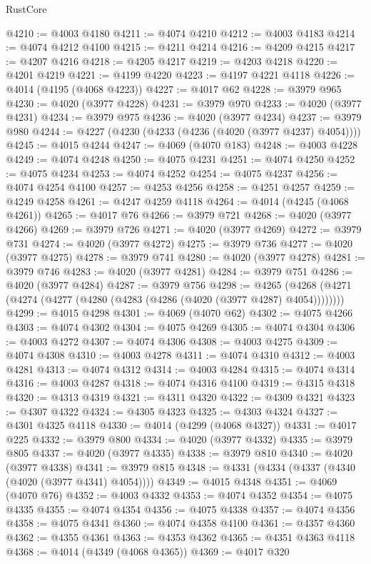 \begin{lexlean}{RustCore}
\begin{coremodule}
@4210 := @4003 @4180
@4211 := @4074 @4210
@4212 := @4003 @4183
@4214 := @4074 @4212 @4100
@4215 := @4211 @4214
@4216 := @4209 @4215
@4217 := @4207 @4216
@4218 := @4205 @4217
@4219 := @4203 @4218
@4220 := @4201 @4219
@4221 := @4199 @4220
@4223 := @4197 @4221 @4118
@4226 := @4014 (@4195 (@4068 @4223))
@4227 := @4017 @62
@4228 := @3979 @965
@4230 := @4020 (@3977 @4228)
@4231 := @3979 @970
@4233 := @4020 (@3977 @4231)
@4234 := @3979 @975
@4236 := @4020 (@3977 @4234)
@4237 := @3979 @980
@4244 := @4227 (@4230 (@4233 (@4236 (@4020 (@3977 @4237) @4054))))
@4245 := @4015 @4244
@4247 := @4069 (@4070 @183)
@4248 := @4003 @4228
@4249 := @4074 @4248
@4250 := @4075 @4231
@4251 := @4074 @4250
@4252 := @4075 @4234
@4253 := @4074 @4252
@4254 := @4075 @4237
@4256 := @4074 @4254 @4100
@4257 := @4253 @4256
@4258 := @4251 @4257
@4259 := @4249 @4258
@4261 := @4247 @4259 @4118
@4264 := @4014 (@4245 (@4068 @4261))
@4265 := @4017 @76
@4266 := @3979 @721
@4268 := @4020 (@3977 @4266)
@4269 := @3979 @726
@4271 := @4020 (@3977 @4269)
@4272 := @3979 @731
@4274 := @4020 (@3977 @4272)
@4275 := @3979 @736
@4277 := @4020 (@3977 @4275)
@4278 := @3979 @741
@4280 := @4020 (@3977 @4278)
@4281 := @3979 @746
@4283 := @4020 (@3977 @4281)
@4284 := @3979 @751
@4286 := @4020 (@3977 @4284)
@4287 := @3979 @756
@4298 := @4265 (@4268 (@4271 (@4274 (@4277 (@4280 (@4283 (@4286 (@4020 (@3977 @4287) @4054))))))))
@4299 := @4015 @4298
@4301 := @4069 (@4070 @62)
@4302 := @4075 @4266
@4303 := @4074 @4302
@4304 := @4075 @4269
@4305 := @4074 @4304
@4306 := @4003 @4272
@4307 := @4074 @4306
@4308 := @4003 @4275
@4309 := @4074 @4308
@4310 := @4003 @4278
@4311 := @4074 @4310
@4312 := @4003 @4281
@4313 := @4074 @4312
@4314 := @4003 @4284
@4315 := @4074 @4314
@4316 := @4003 @4287
@4318 := @4074 @4316 @4100
@4319 := @4315 @4318
@4320 := @4313 @4319
@4321 := @4311 @4320
@4322 := @4309 @4321
@4323 := @4307 @4322
@4324 := @4305 @4323
@4325 := @4303 @4324
@4327 := @4301 @4325 @4118
@4330 := @4014 (@4299 (@4068 @4327))
@4331 := @4017 @225
@4332 := @3979 @800
@4334 := @4020 (@3977 @4332)
@4335 := @3979 @805
@4337 := @4020 (@3977 @4335)
@4338 := @3979 @810
@4340 := @4020 (@3977 @4338)
@4341 := @3979 @815
@4348 := @4331 (@4334 (@4337 (@4340 (@4020 (@3977 @4341) @4054))))
@4349 := @4015 @4348
@4351 := @4069 (@4070 @76)
@4352 := @4003 @4332
@4353 := @4074 @4352
@4354 := @4075 @4335
@4355 := @4074 @4354
@4356 := @4075 @4338
@4357 := @4074 @4356
@4358 := @4075 @4341
@4360 := @4074 @4358 @4100
@4361 := @4357 @4360
@4362 := @4355 @4361
@4363 := @4353 @4362
@4365 := @4351 @4363 @4118
@4368 := @4014 (@4349 (@4068 @4365))
@4369 := @4017 @320

\end{coremodule}
\end{lexlean}
